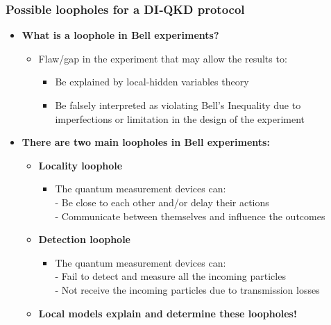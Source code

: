 \documentclass{beamer}
\begin{document}
		\begin{frame}
			\frametitle{\Large Possible loopholes for a DI‑QKD protocol}

            \vspace{3.5ex}
            \begin{itemize}
                \item \textbf{What is a loophole in Bell experiments?}
                \begin{itemize}
                    \item Flaw/gap in the experiment that may allow the results to:
                    \begin{itemize}
                        \item Be explained by local-hidden variables theory
                        \item Be falsely interpreted as violating Bell's Inequality due to imperfections or limitation in the design of the experiment
                    \end{itemize}
                \end{itemize}
                \item \textbf{There are two main loopholes in Bell experiments:}
                \begin{itemize}
                    \item \textbf{Locality loophole}
                    \begin{itemize}
                        \small
                        \item The quantum measurement devices can:\\
                        \footnotesize
                        - Be close to each other and/or delay their actions\\
                        - Communicate between themselves and influence the outcomes
                    \end{itemize}
                    \item \textbf{Detection loophole}
                    \begin{itemize}
                        \small
                        \item The quantum measurement devices can:\\
                        \footnotesize
                        - Fail to detect and measure all the incoming particles\\
                        - Not receive the incoming particles due to transmission losses
                    \end{itemize}
                    \vspace{1ex}
                    \item \textbf{Local models explain and determine these loopholes!}
                \end{itemize}
            \end{itemize}
		\end{frame}
\end{document}
